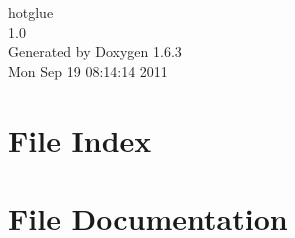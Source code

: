 \documentclass[a4paper]{book}
\begin{document}
\hypersetup{pageanchor=false}
\begin{titlepage}
\vspace*{7cm}
\begin{center}
{\Large hotglue \\[1ex]\large 1.0 }\\
\vspace*{1cm}
{\large Generated by Doxygen 1.6.3}\\
\vspace*{0.5cm}
{\small Mon Sep 19 08:14:14 2011}\\
\end{center}
\end{titlepage}
\clearemptydoublepage
{}
\tableofcontents
\clearemptydoublepage
{}
\hypersetup{pageanchor=true}
\chapter{File Index}

\chapter{File Documentation}
























\printindex
\end{document}
